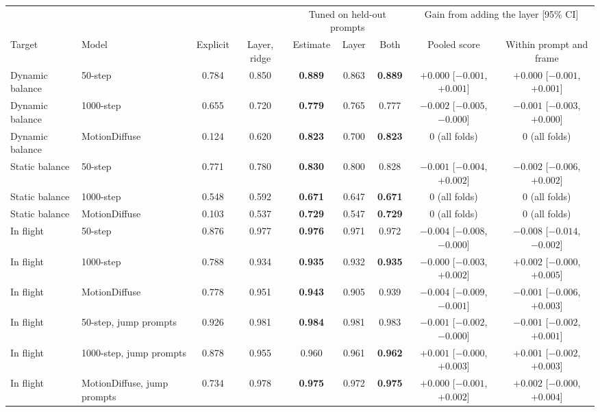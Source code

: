 \begin{tabular}{llccccccc}
\toprule
& & & & \multicolumn{3}{c}{Tuned on held-out prompts} & \multicolumn{2}{c}{Gain from adding the layer [95\% CI]} \\
\cmidrule(lr){5-7} \cmidrule(lr){8-9}
Target & Model & Explicit & Layer, ridge & Estimate & Layer & Both & Pooled score & Within prompt and frame \\
\midrule
Dynamic balance & 50-step & 0.784 & 0.850 & \textbf{0.889} & 0.863 & \textbf{0.889} & $+0.000$ [$-0.001$, $+0.001$] & $+0.000$ [$-0.001$, $+0.001$] \\
Dynamic balance & 1000-step & 0.655 & 0.720 & \textbf{0.779} & 0.765 & 0.777 & $-0.002$ [$-0.005$, $-0.000$] & $-0.001$ [$-0.003$, $+0.000$] \\
Dynamic balance & MotionDiffuse & 0.124 & 0.620 & \textbf{0.823} & 0.700 & \textbf{0.823} & $0$ (all folds) & $0$ (all folds) \\
\addlinespace[2pt]
Static balance & 50-step & 0.771 & 0.780 & \textbf{0.830} & 0.800 & 0.828 & $-0.001$ [$-0.004$, $+0.002$] & $-0.002$ [$-0.006$, $+0.002$] \\
Static balance & 1000-step & 0.548 & 0.592 & \textbf{0.671} & 0.647 & \textbf{0.671} & $0$ (all folds) & $0$ (all folds) \\
Static balance & MotionDiffuse & 0.103 & 0.537 & \textbf{0.729} & 0.547 & \textbf{0.729} & $0$ (all folds) & $0$ (all folds) \\
\addlinespace[2pt]
In flight & 50-step & 0.876 & 0.977 & \textbf{0.976} & 0.971 & 0.972 & $-0.004$ [$-0.008$, $-0.000$] & $-0.008$ [$-0.014$, $-0.002$] \\
In flight & 1000-step & 0.788 & 0.934 & \textbf{0.935} & 0.932 & \textbf{0.935} & $-0.000$ [$-0.003$, $+0.002$] & $+0.002$ [$-0.000$, $+0.005$] \\
In flight & MotionDiffuse & 0.778 & 0.951 & \textbf{0.943} & 0.905 & 0.939 & $-0.004$ [$-0.009$, $-0.001$] & $-0.001$ [$-0.006$, $+0.003$] \\
In flight & 50-step, jump prompts & 0.926 & 0.981 & \textbf{0.984} & 0.981 & 0.983 & $-0.001$ [$-0.002$, $-0.000$] & $-0.001$ [$-0.002$, $+0.001$] \\
In flight & 1000-step, jump prompts & 0.878 & 0.955 & 0.960 & 0.961 & \textbf{0.962} & $+0.001$ [$-0.000$, $+0.003$] & $+0.001$ [$-0.002$, $+0.003$] \\
In flight & MotionDiffuse, jump prompts & 0.734 & 0.978 & \textbf{0.975} & 0.972 & \textbf{0.975} & $+0.000$ [$-0.001$, $+0.002$] & $+0.002$ [$-0.000$, $+0.004$] \\

\end{tabular}

